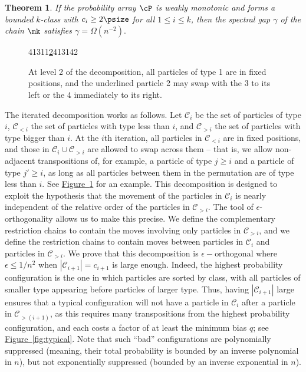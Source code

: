 \documentclass[11pt]{article}
\newtheorem{theorem}{Theorem}[section]
\providecommand{\expref}[2]{\texorpdfstring{\hyperref[#2]{#1~\ref{#2}}}{#1~\ref{#2}}}
\begin{document}
\newtheorem*{thm:mk}{\expref{Theorem}{pprocess}}

\begin{theorem}\label{pprocess}
%
%
If the probability array $\cP$ is   %
weakly monotonic and %
forms  %
a bounded $k$-class
with  $c_i\geq 2\psize$ for all $1\leq i \leq k$, 
then the spectral gap $\gamma$ of the chain $\mk$ satisfies
\abovedisplayskip=3pt
\belowdisplayskip=3pt
$\gamma =\Omega(n^{-2}).$
\end{theorem}

\begin{figure}[]
  \centering
    \newcommand{\one}{{\color{gray}1}}
     {\color{red} 4\one 3\one \one \underline{2}4\one 3\one 42}\\
    \caption{At level 2 of the decomposition, all particles of type 1 are in fixed positions, and the underlined particle 2 may swap with the 3 to its left or the 4 immediately to its right.}
\label{fig:SwapAcross}
\end{figure}

The iterated decomposition works as follows. Let $\mathcal{C}_{i}$ be 
the set of particles of type $i$, $\mathcal{C}_{<i}$ the set of 
particles with type less than $i$, and $\mathcal{C}_{>i}$ the set of 
particles with type bigger than $i$. At the $i$th iteration, all 
particles in $\mathcal{C}_{<i}$ are in fixed positions, and those in 
$\mathcal{C}_{i}\cup \mathcal{C}_{>i}$ are allowed to swap across them
-- that is, we allow non-adjacent transpositions of, for example, a particle 
of type $j\geq i$ and a particle of type $j'\geq i$, as long as all particles 
between them in the permutation are of type less than $i$. %
%
%
%
See \expref{Figure}{fig:SwapAcross}
for an example.  %
This decomposition is designed to 
exploit the hypothesis that the movement of the particles in 
$\mathcal{C}_{i}$ is nearly independent of the relative order of the 
particles in $\mathcal{C}_{>i}$.  The tool of $\epsilon$-orthogonality 
allows us to make this precise.  We define the complementary 
restriction chains to contain the moves involving only particles in 
$\mathcal{C}_{>i}$, and we define the restriction chains to contain 
moves between particles in $\mathcal{C}_{i}$ and particles in 
$\mathcal{C}_{>i}$. We prove that this decomposition is 
%
$\epsilon-$orthogonal where $\epsilon\leq 1/n^2$ %
when $|\mathcal{C}_{i+1}| = c_{i+1}$ is large 
enough.  Indeed, the highest probability configuration is the one in 
which particles are sorted by class, with all particles of smaller type 
appearing before particles of larger type.  Thus, having 
$|\mathcal{C}_{i+1}|$ large ensures that a typical configuration will 
not have a particle in $\mathcal{C}_{i}$ after a particle in 
$\mathcal{C}_{>(i+1)}$, as this requires many transpositions from the 
highest probability configuration, and each costs a factor of at least 
the minimum bias $q$; see \expref{Figure}{fig:typical}.  Note that such 
``bad'' configurations are polynomially suppressed 
(meaning, their total probability is bounded by an inverse polynomial in $n$), %
but not exponentially suppressed
(bounded by an inverse exponential in $n$).  %
%
%
\end{document}
